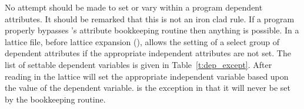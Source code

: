 No attempt should be made to set or vary within a program dependent
attributes. It should be remarked that this is not an iron clad rule.
If a program properly bypasses \bmad's attribute bookkeeping routine
then anything is possible. In a lattice file, before lattice expansion
(), \bmad allows the setting of a select group of
dependent attributes if the appropriate independent attributes are
not set. The list of settable dependent variables is given in
Table~\ref{t:dep_except}.  After reading in the lattice \bmad will set
the appropriate independent variable based upon the value of the
dependent variable.  is the exception in that it will never
be set by the bookkeeping routine.
\begin{table}[ht]
\caption {Dependent variables that can be set in a primary lattice file.}
\label{t:dep_except}
\end{table}

